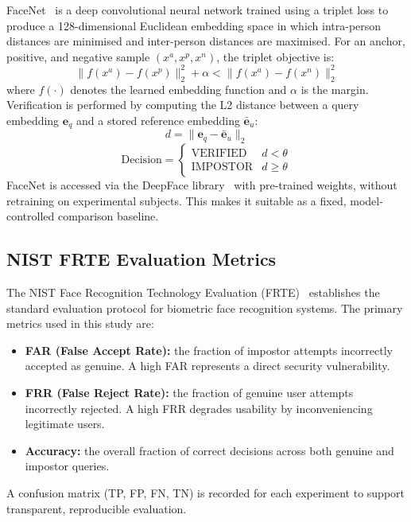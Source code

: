 \documentclass[conference]{IEEEtran}
\begin{document}
FaceNet~\cite{schroff2015} is a deep convolutional neural
network trained using a triplet loss to produce a
128-dimensional Euclidean embedding space in which intra-person
distances are minimised and inter-person distances are
maximised. For an anchor, positive, and negative sample
$(x^a, x^p, x^n)$, the triplet objective is:
\begin{equation}
  \|f(x^a) - f(x^p)\|_2^2 + \alpha
    < \|f(x^a) - f(x^n)\|_2^2
\end{equation}
where $f(\cdot)$ denotes the learned embedding function and
$\alpha$ is the margin. Verification is performed by computing
the L2 distance between a query embedding $\mathbf{e}_q$ and
a stored reference embedding $\bar{\mathbf{e}}_u$:
\begin{equation}
  d = \|\mathbf{e}_q - \bar{\mathbf{e}}_u\|_2
\end{equation}
\begin{equation}
  \text{Decision} =
    \begin{cases}
      \text{VERIFIED}  & d < \theta \\
      \text{IMPOSTOR}  & d \geq \theta
    \end{cases}
\end{equation}
FaceNet is accessed via the DeepFace library~\cite{serengil2020}
with pre-trained weights, without retraining on experimental
subjects. This makes it suitable as a fixed, model-controlled
comparison baseline.

\subsection{NIST FRTE Evaluation Metrics}

The NIST Face Recognition Technology Evaluation
(FRTE)~\cite{nist2024} establishes the standard evaluation
protocol for biometric face recognition systems. The primary
metrics used in this study are:
\begin{itemize}
  \item \textbf{FAR (False Accept Rate):} the fraction of
        impostor attempts incorrectly accepted as genuine.
        A high FAR represents a direct security vulnerability.
  \item \textbf{FRR (False Reject Rate):} the fraction of
        genuine user attempts incorrectly rejected. A high FRR
        degrades usability by inconveniencing legitimate users.
  \item \textbf{Accuracy:} the overall fraction of correct
        decisions across both genuine and impostor queries.
\end{itemize}
A confusion matrix (TP, FP, FN, TN) is recorded for each
experiment to support transparent, reproducible evaluation.
\end{document}
